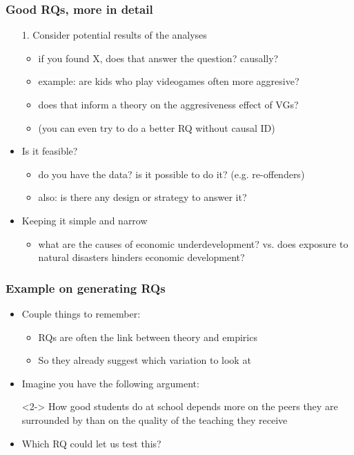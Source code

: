 \documentclass[aspectratio=43]{beamer}
\begin{document}
\begin{frame}
\frametitle{Good RQs, more in detail}
\centering

\begin{itemize}
  \item[1.] Consider potential results of the analyses
  \begin{itemize}
    \item if you found X, does that answer the question? causally?
    \item example: are kids who play videogames often more aggresive?
    \item does that inform a theory on the aggresiveness effect of VGs?
    \item (you can even try to do a better RQ without causal ID)
  \end{itemize}
  \item<2->[2.] Is it feasible?
  \begin{itemize}
    \item do you have the data? is it possible to do it? (e.g. re-offenders)
    \item also: is there any design or strategy to answer it?
  \end{itemize}
  \item<3->[3.] Keeping it simple and narrow
  \begin{itemize}
    \item what are the causes of economic underdevelopment? vs. does exposure to natural disasters hinders economic development?
  \end{itemize}
\end{itemize}

\end{frame}

\begin{frame}
\frametitle{Example on generating RQs}
\centering

\begin{itemize}
  \item<1-> Couple things to remember:
  \begin{itemize}
    \item RQs are often the link between theory and empirics
    \item So they already suggest which variation to look at
  \end{itemize}
  \item[]
  \item<2-> Imagine you have the following argument:
  \item[]<2-> How good students do at school depends more on the peers they are surrounded by than on the quality of the teaching they receive
  \item[]
  \item<2-> Which RQ could let us test this?
\end{itemize}

\end{frame}
\end{document}
